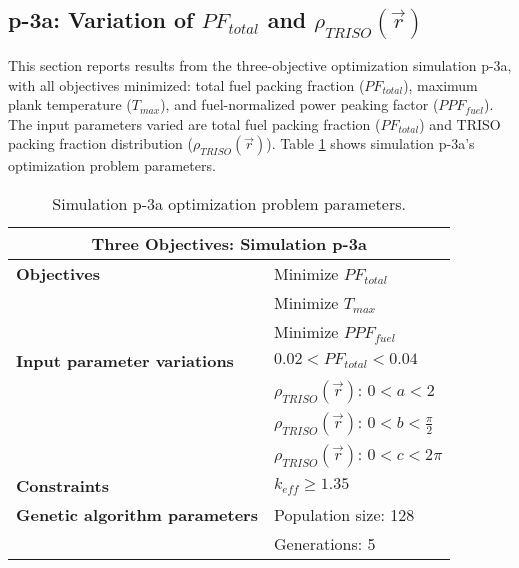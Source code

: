 \subsection{p-3a: Variation of $PF_{total}$ and $\rho_{TRISO}(\vec{r})$}
\label{sec:p-3a}
This section reports results from the three-objective optimization simulation p-3a, 
with all objectives minimized: total fuel packing fraction ($PF_{total}$), 
maximum plank temperature ($T_{max}$), and fuel-normalized power peaking factor 
($PPF_{fuel}$).  
The input parameters varied are total fuel packing fraction ($PF_{total}$) and 
TRISO packing fraction distribution ($\rho_{TRISO}(\vec{r})$). 
Table \ref{tab:simulationp3a} shows simulation p-3a's optimization problem parameters. 
\begin{table}[htbp!]
    \centering
    \onehalfspacing
    \caption{Simulation p-3a optimization problem parameters.}
	\label{tab:simulationp3a}
    \footnotesize
    \begin{tabular}{l|p{4cm}}
    \hline 
    \multicolumn{2}{c}{\textbf{Three Objectives: Simulation p-3a}} \\
    \hline 
    \textbf{Objectives} & Minimize $PF_{total}$ \\
    & Minimize $T_{max}$ \\
    & Minimize $PPF_{fuel}$ \\
    \hline 
    \textbf{Input parameter variations} & $0.02<PF_{total}<0.04$ \\
    & $\rho_{TRISO}(\vec{r})$: $0<a<2$ \\
    & $\rho_{TRISO}(\vec{r})$: $0<b<\frac{\pi}{2}$ \\
    & $\rho_{TRISO}(\vec{r})$: $0<c<2\pi$ \\
    \hline
    \textbf{Constraints} & $k_{eff} \geq 1.35$\\ 
    \hline 
    \textbf{Genetic algorithm parameters} & Population size: 128 \\
    & Generations: 5 \\
    \hline
    \end{tabular}
\end{table}

